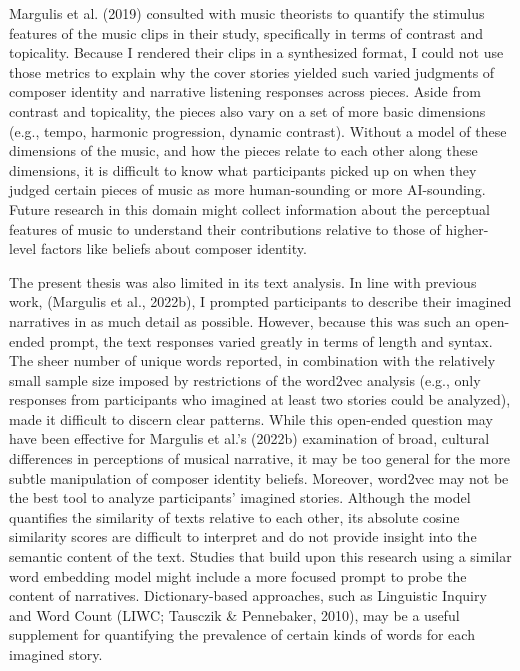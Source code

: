\documentclass[12pt,twoside]{reedthesis}
\begin{document}
Margulis et al. (2019) consulted with music theorists to quantify the stimulus features of the music clips in their study, specifically in terms of contrast and topicality. Because I rendered their clips in a synthesized format, I could not use those metrics to explain why the cover stories yielded such varied judgments of composer identity and narrative listening responses across pieces. Aside from contrast and topicality, the pieces also vary on a set of more basic dimensions (e.g., tempo, harmonic progression, dynamic contrast). Without a model of these dimensions of the music, and how the pieces relate to each other along these dimensions, it is difficult to know what participants picked up on when they judged certain pieces of music as more human-sounding or more AI-sounding. Future research in this domain might collect information about the perceptual features of music to understand their contributions relative to those of higher-level factors like beliefs about composer identity. 

The present thesis was also limited in its text analysis. In line with previous work, (Margulis et al., 2022b), I prompted participants to describe their imagined narratives in as much detail as possible. However, because this was such an open-ended prompt, the text responses varied greatly in terms of length and syntax. The sheer number of unique words reported, in combination with the relatively small sample size imposed by restrictions of the word2vec analysis (e.g., only responses from participants who imagined at least two stories could be analyzed), made it difficult to discern clear patterns. While this open-ended question may have been effective for Margulis et al.’s (2022b) examination of broad, cultural differences in perceptions of musical narrative, it may be too general for the more subtle manipulation of composer identity beliefs. Moreover, word2vec may not be the best tool to analyze participants’ imagined stories. Although the model quantifies the similarity of texts relative to each other, its absolute cosine similarity scores are difficult to interpret and do not provide insight into the semantic content of the text. Studies that build upon this research using a similar word embedding model might include a more focused prompt to probe the content of narratives. Dictionary-based approaches, such as Linguistic Inquiry and Word Count (LIWC; Tausczik \& Pennebaker, 2010), may be a useful supplement for quantifying the prevalence of certain kinds of words for each imagined story.
\end{document}
